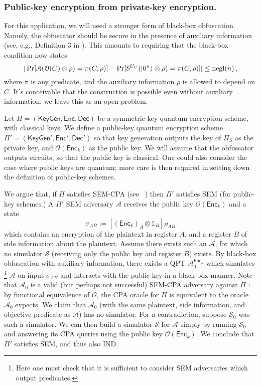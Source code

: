 \documentclass[envcountsame]{llncs}
\numberwithin{equation}{section}
\newcommand{\one}{\mathds 1}
\newcommand{\opn}{\operatorname}
\newcommand{\algo}{\mathcal}
\newcommand{\negl}{\opn{negl}}
\newcommand{\KeyGen}{\ensuremath{\mathsf{KeyGen}}\xspace}
\newcommand{\Enc}{\ensuremath{\mathsf{Enc}}\xspace}
\newcommand{\Dec}{\ensuremath{\mathsf{Dec}}\xspace}
\begin{document}
\subsubsection{Public-key encryption from private-key encryption.}
For this application, we will need a stronger form of black-box obfuscation. Namely, the obfuscator should be secure in the presence of auxiliary information (see, e.g., Definition 3 in \cite{GK05}). This amounts to requiring that the black-box condition now states
$$
|\Pr[\algo A( \algo O(C) \otimes \rho) = \pi(C, \rho)] - \Pr[\algo S^{U_C}(\ket{0^n} \otimes \rho) = \pi(C, \rho)]| \leq \negl(n)\,,
$$
where $\pi$ is any predicate, and the auxiliary information $\rho$ is allowed to depend on $C$. It's conceivable that the construction is possible even without auxiliary information; we leave this as an open problem.

Let $\Pi = (\KeyGen, \Enc, \Dec)$ be a symmetric-key quantum encryption scheme, with classical keys. We define a public-key quantum encryption scheme $\Pi' = (\KeyGen', \Enc', \Dec')$ so that key generation outputs the key of $\Pi_S$ as the private key, and $\algo O(\Enc_k)$ as the public key. We will assume that the obfuscator outputs circuits, so that the public key is classical. One could also consider the case where public keys are quantum; more care is then required in setting down the definition of public-key schemes.

We argue that, if $\Pi$ satisfies SEM-CPA (see ~\cite{ABFGSS16}) then $\Pi'$ satisfies SEM (for public-key schemes.) A $\Pi'$ SEM adversary $\algo A$ receives the public key $\algo O(\Enc_k)$ and a state
$$
\sigma_{AB} := [(\Enc_k)_A \otimes \one_B]\rho_{AB}
$$
which contains an encryption of the plaintext in register $A$, and a register $B$ of side information about the plaintext. Assume there exists such an $\algo A$, for which no simulator $\algo S$ (receiving only the public key and register $B$) exists. By black-box obfuscation with auxiliary information, there exists a QPT $\algo A_0^{\Enc_k}$ which simulates\,\footnote{Here one must check that it is sufficient to consider SEM adversaries which output predicates.} $\algo A$ on input $\sigma_{AB}$ and interacts with the public key in a black-box manner. Note that $\algo A_0$ is a valid (but perhaps not successful) SEM-CPA adversary against $\Pi$ : by functional equivalence of $\algo O$, the CPA oracle for $\Pi$ is equivalent to the oracle $\algo A_0$ expects. We claim that $\algo A_0$ (with the same plaintext, side information, and objective predicate as $\algo A$) has no simulator. For a contradiction, suppose $\algo S_0$ was such a simulator. We can then build a simulator $\algo S$ for $\algo A$ simply by running $\algo S_0$ and answering its CPA queries using the public key $\algo O(\Enc_k)$. We conclude that $\Pi'$ satisfies SEM, and thus also IND.
\end{document}
